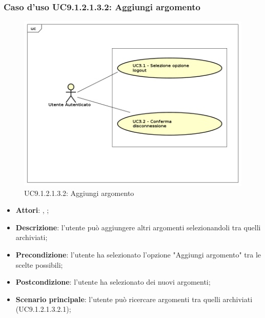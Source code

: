 						\subsubsection{Caso d'uso UC9.1.2.1.3.2: Aggiungi argomento}
						\label{UC9.1.2.1.3.2}
						\begin{figure}[h]
							\centering
							\includegraphics[scale=0.5,keepaspectratio]{UML/UC9.png}
							\caption{UC9.1.2.1.3.2: Aggiungi argomento}
						\end{figure}
						\FloatBarrier
						\begin{itemize}
							\item \textbf{Attori}: \uau, \uaupro;
							\item \textbf{Descrizione}: l'utente può aggiungere altri argomenti selezionandoli tra quelli archiviati;  
							\item \textbf{Precondizione}: l'utente ha selezionato l'opzione "Aggiungi argomento" tra le scelte possibili;
							\item \textbf{Postcondizione}: l'utente ha selezionato dei nuovi argomenti;
							\item \textbf{Scenario principale}: l'utente può ricercare argomenti tra quelli archiviati (UC9.1.2.1.3.2.1);
						\end{itemize}
						
